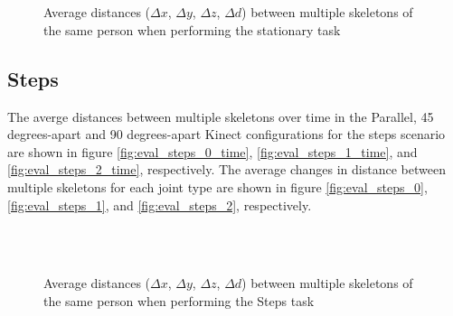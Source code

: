 \documentclass{sigchi}
\begin{document}
\begin{figure}
  \centering

   \\
   \\
  

  \caption{Average distances ($\Delta x$, $\Delta y$, $\Delta z$, $\Delta d$) between multiple skeletons
    of the same person when performing the stationary task}

  \label{fig:results_stationary_3d}
\end{figure}

\subsection{Steps}

The averge distances between multiple skeletons over time in the Parallel, 45 degrees-apart and 90 degrees-apart Kinect configurations for the steps scenario are shown in figure \ref{fig:eval_steps_0_time}, \ref{fig:eval_steps_1_time}, and \ref{fig:eval_steps_2_time}, respectively. The average changes in distance between multiple skeletons for each joint type are shown in figure \ref{fig:eval_steps_0}, \ref{fig:eval_steps_1}, and \ref{fig:eval_steps_2}, respectively.


\begin{figure}
  \centering

  
   \\
  
   \\
  
  

  \caption{Average distances ($\Delta x$, $\Delta y$, $\Delta z$, $\Delta d$) between multiple skeletons
    of the same person when performing the Steps task}

  \label{fig:results_steps}
\end{figure}
\end{document}
